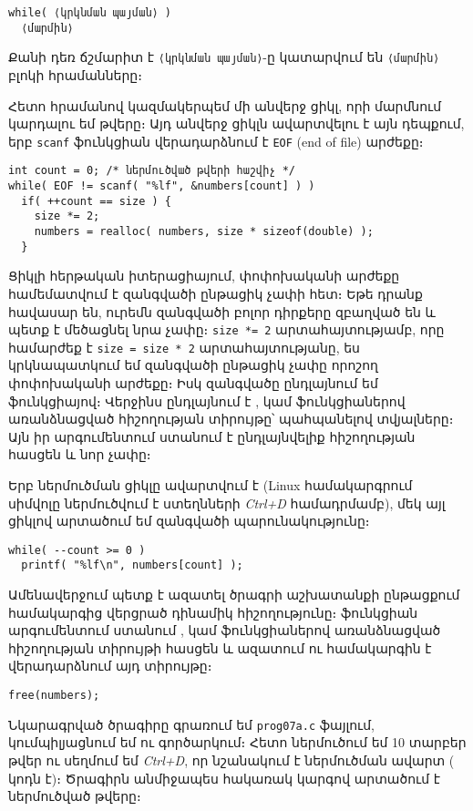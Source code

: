 \begin{verbatim}
while( ⟨կրկնման պայման⟩ )
  ⟨մարմին⟩
\end{verbatim}

Քանի դեռ ճշմարիտ է \texttt{⟨կրկնման\ պայման⟩}-ը կատարվում են
\texttt{⟨մարմին⟩} բլոկի հրամանները։

Հետո  հրամանով կազմակերպեմ մի անվերջ ցիկլ, որի մարմնում
կարդալու եմ թվերը։ Այդ անվերջ ցիկլն ավարտվելու է այն դեպքում, երբ
\texttt{scanf} ֆունկցիան վերադարձնում է \texttt{EOF} (end of file)
արժեքը։

\begin{Verbatim}
int count = 0; /* ներմուծված թվերի հաշվիչ */
while( EOF != scanf( "%lf", &numbers[count] ) )
  if( ++count == size ) {
    size *= 2;
    numbers = realloc( numbers, size * sizeof(double) );
  }
\end{Verbatim}

Ցիկլի հերթական իտերացիայում,  փոփոխականի արժեքը
համեմատվում է զանգվածի ընթացիկ չափի հետ։ Եթե դրանք հավասար են, ուրեմն
զանգվածի բոլոր դիրքերը զբաղված են և պետք է մեծացնել նրա չափը։
\texttt{size *= 2} արտահայտությամբ, որը համարժեք է
\texttt{size = size * 2} արտահայտությանը, ես կրկնապատկում եմ
զանգվածի ընթացիկ չափը որոշող փոփոխականի արժեքը։ Իսկ 
զանգվածը ընդլայնում եմ  ֆունկցիայով։ Վերջինս ընդլայնում
է ,  կամ  ֆունկցիաներով
առանձնացված հիշողության տիրույթը՝ պահպանելով տվյալները։ Այն իր
արգումենտում ստանում է ընդլայնվելիք հիշողության հասցեն և նոր չափը։

Երբ ներմուծման ցիկլը ավարտվում է (Linux համակարգրում 
սիմվոլը ներմուծվում է ստեղնների \textit{Ctrl+D} համադրմամբ), մեկ այլ
 ցիկլով արտածում եմ  զանգվածի
պարունակությունը։

\begin{Verbatim}
while( --count >= 0 )
  printf( "%lf\n", numbers[count] );
\end{Verbatim}

Ամենավերջում պետք է ազատել ծրագրի աշխատանքի ընթացքում համակարգից վերցրած
դինամիկ հիշողությունը։  ֆունկցիան արգումենտում ստանում
,  կամ  ֆունկցիաներով
առանձնացված հիշողության տիրույթի հասցեն և ազատում ու համակարգին է
վերադարձնում այդ տիրույթը։

\begin{Verbatim}
free(numbers);
\end{Verbatim}

Նկարագրված ծրագիրը գրառում եմ \texttt{prog07a.c} ֆայլում, կումպիլյացնում
եմ ու գործարկում։ Հետո ներմուծում եմ 10 տարբեր թվեր ու սեղմում եմ
\textit{Ctrl+D}, որ նշանակում է ներմուծման ավարտ ( կոդն է)։
Ծրագիրն անմիջապես հակառակ կարգով արտածում է ներմուծված թվերը։

